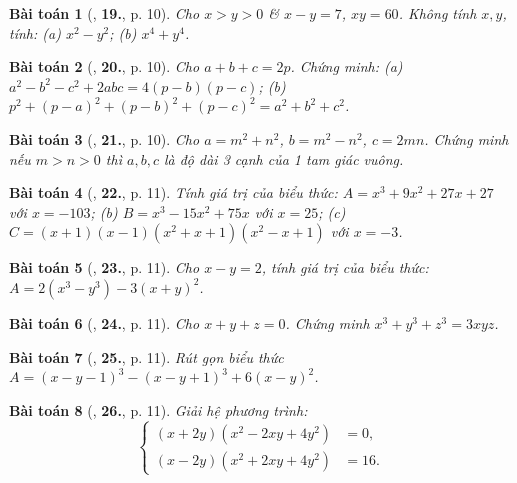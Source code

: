 \documentclass{article}
\numberwithin{equation}{section}
\newtheorem{baitoan}{Bài toán}
\begin{document}
\begin{baitoan}[\cite{Tuyen_Toan_8}, \textbf{19.}, p. 10]
	Cho $x > y > 0$ \& $x - y = 7$, $xy = 60$. Không tính $x,y$, tính: (a) $x^2 - y^2$; (b) $x^4 + y^4$.
\end{baitoan}

\begin{baitoan}[\cite{Tuyen_Toan_8}, \textbf{20.}, p. 10]
	Cho $a + b + c = 2p$. Chứng minh: (a) $a^2 - b^2 - c^2 + 2abc = 4(p - b)(p - c)$; (b) $p^2 + (p - a)^2 + (p - b)^2 + (p - c)^2 = a^2 + b^2 + c^2$.
\end{baitoan}

\begin{baitoan}[\cite{Tuyen_Toan_8}, \textbf{21.}, p. 10]
	Cho $a = m^2 + n^2$, $b = m^2 - n^2$, $c = 2mn$. Chứng minh nếu $m > n > 0$ thì $a,b,c$ là độ dài 3 cạnh của 1 tam giác vuông.
\end{baitoan}

\begin{baitoan}[\cite{Tuyen_Toan_8}, \textbf{22.}, p. 11]
	Tính giá trị của biểu thức: $A = x^3 + 9x^2 + 27x + 27$ với $x = -103$; (b) $B = x^3 - 15x^2 + 75x$ với $x = 25$; (c) $C = (x + 1)(x - 1)(x^2 + x + 1)(x^2 - x + 1)$ với $x = -3$.
\end{baitoan}

\begin{baitoan}[\cite{Tuyen_Toan_8}, \textbf{23.}, p. 11]
	Cho $x - y = 2$, tính giá trị của biểu thức: $A = 2(x^3 - y^3) - 3(x + y)^2$.
\end{baitoan}

\begin{baitoan}[\cite{Tuyen_Toan_8}, \textbf{24.}, p. 11]
	Cho $x + y + z = 0$. Chứng minh $x^3 + y^3 + z^3 = 3xyz$.
\end{baitoan}

\begin{baitoan}[\cite{Tuyen_Toan_8}, \textbf{25.}, p. 11]
	Rút gọn biểu thức $A = (x - y - 1)^3 - (x - y + 1)^3 + 6(x - y)^2$.
\end{baitoan}

\begin{baitoan}[\cite{Tuyen_Toan_8}, \textbf{26.}, p. 11]
	Giải hệ phương trình:
	\begin{equation*}
		\left\{\begin{split}
			(x + 2y)(x^2 - 2xy + 4y^2) &= 0,\\
			(x - 2y)(x^2 + 2xy + 4y^2) &= 16.
		\end{split}\right.
	\end{equation*}
\end{baitoan}
\end{document}
